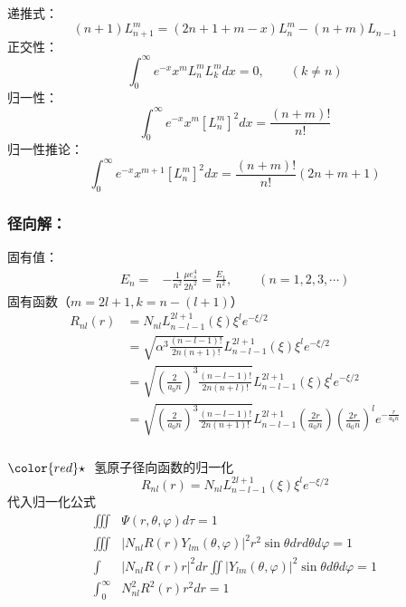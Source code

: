 \begin{frame}
递推式：
\begin{equation*}
  (n+1)	L^m _{n+1} = (2n+1+m -x) L^m _n  - (n+m)  L_{n-1}  
\end{equation*}	
正交性：
\begin{equation*}
  \int_{0}^{\infty}  e^{-x} x^m  L^m _n L^ m _k dx =0, \qquad  (k\ne n)
\end{equation*}	
归一性：
\begin{equation*}
  \int_{0}^{\infty}  e^{-x} x^m  [L^m _{n}]^2  dx = \frac{(n+m)!}{n!} 
\end{equation*}			
归一性推论：
\begin{equation*}
  \int_{0}^{\infty}  e^{-x} x^{m+1}  [L^m _{n}]^2  dx = \frac{(n+m)!}{n!}  (2n+m+1)
\end{equation*}			
\end{frame}		

\begin{frame}
\frametitle{径向解：}	
固有值：
\begin{equation*}
  \begin{split}
    E_n =& - \frac{1}{n^2} \frac{\mu e^4 _s }{2 \hbar ^2} =\frac{E_1}{n^2}, \qquad (n=1,2,3,\cdots) 
  \end{split}		
\end{equation*}	
固有函数（$m=2l+1, k= n-(l+1)$）
\begin{equation*}
  \begin{aligned}
    R_{nl}(r) & = N_{nl} L_{n-l-1} ^{2l+1} (\xi)  \xi  ^l e^{-\xi/2}  \\
    &= \sqrt{\alpha^3 \frac{ (n-l-1)!}{2n (n+1)!}} L_{n-l-1} ^{2l+1} (\xi)  \xi  ^l e^{-\xi/2}  \\
    &=  \sqrt{\left(\frac{2}{a_0 n}\right)^3 \frac{ (n-l-1)!}{2n (n+l)!}} L_{n-l-1} ^{2l+1} (\xi)  \xi  ^l e^{-\xi/2} \\
    &= \sqrt{\left(\frac{2}{a_0 n}\right)^3 \frac{ (n-l-1)!}{2n (n+1)! }} L_{n-l-1} ^{2l+1} (\frac{2r}{a_0 n}) \left(\frac{2r}{a_0 n}\right)^l e^{-\frac{r}{a_0 n}} 
  \end{aligned}
\end{equation*}
\end{frame}	

\begin{frame}[label=current]
\frametitle{}
${\color{red}\star}~$ 氢原子径向函数的归一化 
\begin{equation*}
  R_{nl}(r)= N_{nl} L_{n-l-1} ^{2l+1} (\xi)  \xi  ^l e^{-\xi/2} 
\end{equation*} 
代入归一化公式
\begin{equation*}
  \begin{split}
    \iiint  &\Psi(r,\theta,\varphi) d \tau =1  \\
    \iiint  &|N_{nl} R (r) Y_{lm} (\theta,\varphi)| ^2 r^2 \sin \theta dr d\theta d\varphi =1  \\
     \int  &|N_{nl} R (r) r| ^2 dr \iint |Y_{lm} (\theta,\varphi)| ^2 \sin \theta d\theta d\varphi =1  \\
    \int_{0}^{\infty}  & N^2_{nl} R^2  (r)  r^2 dr =1 	
  \end{split}		
\end{equation*}
\end{frame}	

